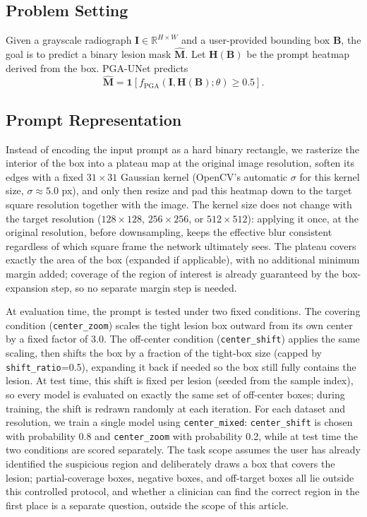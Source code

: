 \subsection{Problem Setting}
Given a grayscale radiograph $\mathbf{I}\in\mathbb{R}^{H\times W}$ and a user-provided bounding box $\mathbf{B}$, the goal is to predict a binary lesion mask $\hat{\mathbf{M}}$. Let $\mathbf{H}(\mathbf{B})$ be the prompt heatmap derived from the box. PGA-UNet predicts
\begin{equation}
\hat{\mathbf{M}} = \mathbf{1}\left[f_{\mathrm{PGA}}\left(\mathbf{I},\mathbf{H}(\mathbf{B});\theta\right)\ge 0.5\right].
\end{equation}

\subsection{Prompt Representation}
\label{sec:prompt-rep}
Instead of encoding the input prompt as a hard binary rectangle, we rasterize the interior of the box into a plateau map at the original image resolution, soften its edges with a fixed $31\times31$ Gaussian kernel (OpenCV's automatic $\sigma$ for this kernel size, $\sigma\approx5.0$ px), and only then resize and pad this heatmap down to the target square resolution together with the image. The kernel size does not change with the target resolution ($128\times128$, $256\times256$, or $512\times512$): applying it once, at the original resolution, before downsampling, keeps the effective blur consistent regardless of which square frame the network ultimately sees. The plateau covers exactly the area of the box (expanded if applicable), with no additional minimum margin added; coverage of the region of interest is already guaranteed by the box-expansion step, so no separate margin step is needed.

At evaluation time, the prompt is tested under two fixed conditions. The covering condition (\texttt{center\_zoom}) scales the tight lesion box outward from its own center by a fixed factor of 3.0. The off-center condition (\texttt{center\_shift}) applies the same scaling, then shifts the box by a fraction of the tight-box size (capped by \texttt{shift\_ratio}=0.5), expanding it back if needed so the box still fully contains the lesion. At test time, this shift is fixed per lesion (seeded from the sample index), so every model is evaluated on exactly the same set of off-center boxes; during training, the shift is redrawn randomly at each iteration. For each dataset and resolution, we train a single model using \texttt{center\_mixed}: \texttt{center\_shift} is chosen with probability 0.8 and \texttt{center\_zoom} with probability 0.2, while at test time the two conditions are scored separately. The task scope assumes the user has already identified the suspicious region and deliberately draws a box that covers the lesion; partial-coverage boxes, negative boxes, and off-target boxes all lie outside this controlled protocol, and whether a clinician can find the correct region in the first place is a separate question, outside the scope of this article.

